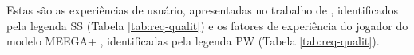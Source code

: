 \begin{apendicesenv}
Estas são as experiências de usuário, apresentadas no trabalho de , identificados pela legenda SS (Tabela \ref{tab:req-qualit}) e os fatores de experiência do jogador do modelo MEEGA+ \cite{Petri_Wangenheim_2019}, identificadas pela legenda PW (Tabela \ref{tab:req-qualit}).


   

   


\end{apendicesenv}
